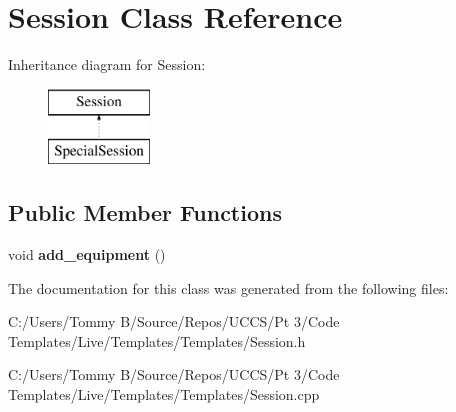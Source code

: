 \hypertarget{class_session}{}\section{Session Class Reference}
\label{class_session}
Inheritance diagram for Session\+:\begin{figure}[H]
\begin{center}
\leavevmode
\includegraphics[height=2.000000cm]{class_session}
\end{center}
\end{figure}
\subsection*{Public Member Functions}
\begin{DoxyCompactItemize}
\item 
\mbox{\label{class_session_a39c8482b1065e7f7ed9e356696e2293c}} 
void {\bfseries add\+\_\+equipment} ()
\end{DoxyCompactItemize}


The documentation for this class was generated from the following files\+:\begin{DoxyCompactItemize}
\item 
C\+:/\+Users/\+Tommy B/\+Source/\+Repos/\+U\+C\+C\+S/\+Pt 3/\+Code Templates/\+Live/\+Templates/\+Templates/Session.\+h\item 
C\+:/\+Users/\+Tommy B/\+Source/\+Repos/\+U\+C\+C\+S/\+Pt 3/\+Code Templates/\+Live/\+Templates/\+Templates/Session.\+cpp\end{DoxyCompactItemize}
